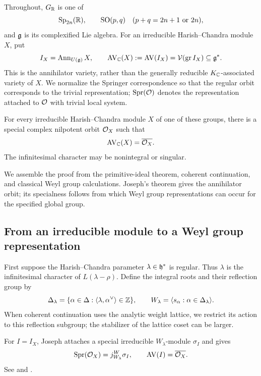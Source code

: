Throughout, $G_{\mathbb{R}}$ is one of
\[
  \operatorname{Sp}_{2n}(\mathbb{R}),\qquad
  \operatorname{SO}(p,q)\quad(p+q=2n+1\text{ or }2n),
\]
and $\mathfrak{g}$ is its complexified Lie algebra. For an irreducible
Harish--Chandra module $X$, put
\[
  I_X=\operatorname{Ann}_{U(\mathfrak{g})}X,\qquad
  \operatorname{AV}_{\mathbb{C}}(X)
  :=\operatorname{AV}(I_X)
  =\mathcal V(\operatorname{gr} I_X)\subseteq\mathfrak{g}^*.
\]
This is the annihilator variety, rather than the generally reducible
$K_{\mathbb{C}}$-associated variety of $X$. We normalize the Springer
correspondence so that the regular orbit corresponds to the trivial
representation; $\operatorname{Spr}(\mathcal{O})$ denotes the representation
attached to $\mathcal{O}$ with trivial local system.

\begin{thm}\label{thm:special-annihilator-classical}
For every irreducible Harish--Chandra module $X$ of one of these groups,
there is a special complex nilpotent orbit $\mathcal{O}_X$ such that
\[
  \operatorname{AV}_{\mathbb{C}}(X)=\overline{\mathcal{O}_X}.
\]
The infinitesimal character may be nonintegral or singular.
\end{thm}

We assemble the proof from the primitive-ideal theorem, coherent
continuation, and classical Weyl group calculations. Joseph's theorem
gives the annihilator orbit; its specialness follows from which Weyl
group representations can occur for the specified global group.

\subsection{From an irreducible module to a Weyl group representation}

First suppose the Harish--Chandra parameter $\lambda\in\mathfrak{h}^*$ is regular.
Thus $\lambda$ is the infinitesimal character of $L(\lambda-\rho)$.
Define the integral roots and their reflection group by
\[
  \Delta_\lambda
  =\{\alpha\in\Delta:\langle\lambda,\alpha^\vee\rangle\in\mathbb{Z}\},
  \qquad
  W_\lambda=\langle s_\alpha:\alpha\in\Delta_\lambda\rangle.
\]
When coherent continuation uses the analytic weight lattice, we
restrict its action to this reflection subgroup; the stabilizer of
the lattice coset can be larger.

For $I=I_X$, Joseph attaches a special irreducible $W_\lambda$-module
$\sigma_I$ and gives
\begin{equation}\label{eq:special-annihilator-joseph}
  \operatorname{Spr}(\mathcal{O}_X)=j_{W_\lambda}^{W}\sigma_I,
  \qquad
  \operatorname{AV}(I)=\overline{\mathcal{O}_X}.
\end{equation}
See \cite[Thm.~3.10]{Jos85} and
\cite[Props.~3.24 and 3.26]{BMSZ22}.

